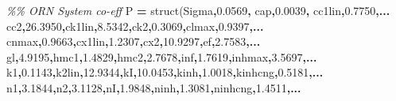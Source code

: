 \documentclass[
]{article}
\newenvironment{Shaded}{\begin{snugshade}}{\end{snugshade}}
\newcommand{\CommentTok}[1]{\textcolor[rgb]{0.56,0.35,0.01}{\textit{#1}}}
\newcommand{\FloatTok}[1]{\textcolor[rgb]{0.00,0.00,0.81}{#1}}
\newcommand{\FunctionTok}[1]{\textcolor[rgb]{0.00,0.00,0.00}{#1}}
\newcommand{\NormalTok}[1]{#1}
\newcommand{\OperatorTok}[1]{\textcolor[rgb]{0.81,0.36,0.00}{\textbf{#1}}}
\newcommand{\StringTok}[1]{\textcolor[rgb]{0.31,0.60,0.02}{#1}}
\begin{document}
\begin{Shaded}
\begin{Highlighting}[]
\CommentTok{\%\% ORN System co{-}eff}
\NormalTok{P }\OperatorTok{=} \FunctionTok{struct}\NormalTok{(}\StringTok{\textquotesingle{}Sigma\textquotesingle{}}\OperatorTok{,}\FloatTok{0.0569}\OperatorTok{,} \StringTok{\textquotesingle{}cap\textquotesingle{}}\OperatorTok{,}\FloatTok{0.0039}\OperatorTok{,} \StringTok{\textquotesingle{}cc1lin\textquotesingle{}}\OperatorTok{,}\FloatTok{0.7750}\OperatorTok{,...}
        \StringTok{\textquotesingle{}cc2\textquotesingle{}}\OperatorTok{,}\FloatTok{26.3950}\OperatorTok{,}\StringTok{\textquotesingle{}ck1lin\textquotesingle{}}\OperatorTok{,}\FloatTok{8.5342}\OperatorTok{,}\StringTok{\textquotesingle{}ck2\textquotesingle{}}\OperatorTok{,}\FloatTok{0.3069}\OperatorTok{,}\StringTok{\textquotesingle{}clmax\textquotesingle{}}\OperatorTok{,}\FloatTok{0.9397}\OperatorTok{,...}
        \StringTok{\textquotesingle{}cnmax\textquotesingle{}}\OperatorTok{,}\FloatTok{0.9663}\OperatorTok{,}\StringTok{\textquotesingle{}cx1lin\textquotesingle{}}\OperatorTok{,}\FloatTok{1.2307}\OperatorTok{,}\StringTok{\textquotesingle{}cx2\textquotesingle{}}\OperatorTok{,}\FloatTok{10.9297}\OperatorTok{,}\StringTok{\textquotesingle{}ef\textquotesingle{}}\OperatorTok{,}\FloatTok{2.7583}\OperatorTok{,...}
        \StringTok{\textquotesingle{}gl\textquotesingle{}}\OperatorTok{,}\FloatTok{4.9195}\OperatorTok{,}\StringTok{\textquotesingle{}hmc1\textquotesingle{}}\OperatorTok{,}\FloatTok{1.4829}\OperatorTok{,}\StringTok{\textquotesingle{}hmc2\textquotesingle{}}\OperatorTok{,}\FloatTok{2.7678}\OperatorTok{,}\StringTok{\textquotesingle{}inf\textquotesingle{}}\OperatorTok{,}\FloatTok{1.7619}\OperatorTok{,}\StringTok{\textquotesingle{}inhmax\textquotesingle{}}\OperatorTok{,}\FloatTok{3.5697}\OperatorTok{,...}
        \StringTok{\textquotesingle{}k1\textquotesingle{}}\OperatorTok{,}\FloatTok{0.1143}\OperatorTok{,}\StringTok{\textquotesingle{}k2lin\textquotesingle{}}\OperatorTok{,}\FloatTok{12.9344}\OperatorTok{,}\StringTok{\textquotesingle{}kI\textquotesingle{}}\OperatorTok{,}\FloatTok{10.0453}\OperatorTok{,}\StringTok{\textquotesingle{}kinh\textquotesingle{}}\OperatorTok{,}\FloatTok{1.0018}\OperatorTok{,}\StringTok{\textquotesingle{}kinhcng\textquotesingle{}}\OperatorTok{,}\FloatTok{0.5181}\OperatorTok{,...}
        \StringTok{\textquotesingle{}n1\textquotesingle{}}\OperatorTok{,}\FloatTok{3.1844}\OperatorTok{,}\StringTok{\textquotesingle{}n2\textquotesingle{}}\OperatorTok{,}\FloatTok{3.1128}\OperatorTok{,}\StringTok{\textquotesingle{}nI\textquotesingle{}}\OperatorTok{,}\FloatTok{1.9848}\OperatorTok{,}\StringTok{\textquotesingle{}ninh\textquotesingle{}}\OperatorTok{,}\FloatTok{1.3081}\OperatorTok{,}\StringTok{\textquotesingle{}ninhcng\textquotesingle{}}\OperatorTok{,}\FloatTok{1.4511}\OperatorTok{,...}

\end{Highlighting}
\end{Shaded}
\end{document}
